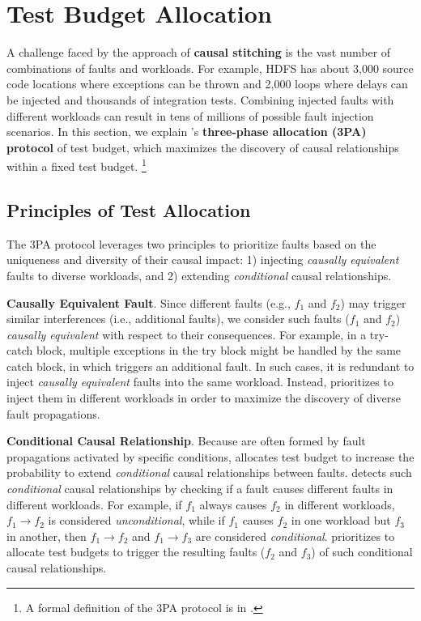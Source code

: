 \section{Test Budget Allocation}
\label{sec:alloc}



A challenge faced by the approach of \textbf{causal stitching} 
is the vast number of combinations of faults and workloads. 
For example, HDFS has about 3,000 source code locations 
where exceptions can be thrown 
and 2,000 loops where delays can be injected 
and thousands of integration tests. 
Combining injected faults 
with different workloads can result in
tens of millions of possible fault injection scenarios. 
In this section, 
we explain \tool's \textbf{three-phase allocation (3PA) protocol} of test budget, 
which maximizes the discovery of causal relationships 
within a fixed test budget. 
\footnote{A formal definition of the 3PA protocol is in .}

\subsection{Principles of Test Allocation}

The 3PA protocol 
leverages two principles  
to prioritize faults based on 
the uniqueness and diversity of their causal impact: 
1) injecting \textit{causally equivalent} faults to diverse workloads, 
and 2) extending \textit{conditional} causal relationships. 


\textbf{Causally Equivalent Fault}. 
Since 
different faults (e.g., $f_1$ and $f_2$) 
may trigger similar interferences (i.e., additional faults), 
we consider such faults ($f_1$ and $f_2$) \textit{causally equivalent} with respect to their consequences. 
For example, in a try-catch block, 
multiple exceptions in the try block 
might be handled by the same catch block, 
in which triggers an additional fault. 
In such cases, 
it is redundant to inject \textit{causally equivalent} faults 
into the same workload. 
Instead, 
\tool prioritizes to inject them in different workloads 
in order to maximize the discovery of diverse fault propagations. 

\textbf{Conditional Causal Relationship}. 
Because
\vcs 
are often formed by 
fault propagations activated by specific conditions, 
\tool 
allocates test budget 
to increase the probability 
to extend \textit{conditional} causal relationships between faults. 
\tool detects 
such \textit{conditional} causal relationships 
by checking if a fault causes different faults in different workloads. 
For example, 
if $f_1$ always causes $f_2$ in different workloads, $f_1 \rightarrow f_2$ is considered \textit{unconditional}, 
while if $f_1$ causes $f_2$ in one workload but $f_3$ in another, 
then $f_1 \rightarrow f_2$ and $f_1 \rightarrow f_3$ are considered 
\textit{conditional}. 
\tool prioritizes to allocate test budgets 
to trigger the resulting faults ($f_2$ and $f_3$) 
of such conditional causal relationships. 


